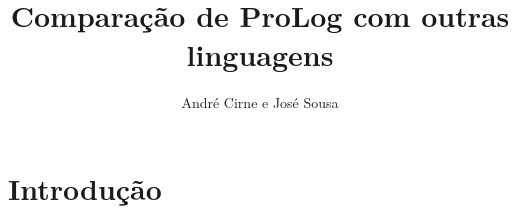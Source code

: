 \documentclass[12pt,a4paper]{report}
\author{André Cirne e José Sousa}
\title{Comparação de ProLog com outras linguagens}
\begin{document}
\maketitle
\tableofcontents
\section{Introdução}

	
\end{document}
